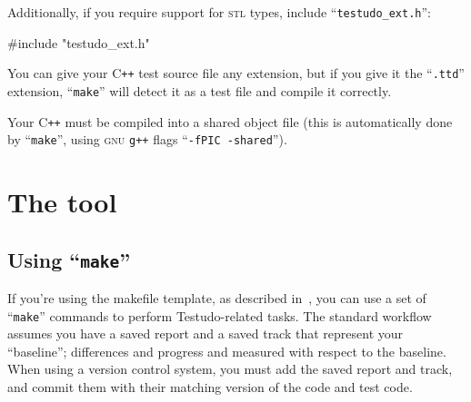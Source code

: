 \documentclass[twoside, a4paper, article]{memoir}
\newcommand*\Cpp{C\texttt{++}}
\begin{document}
Additionally, if you require support for \textsc{stl} types, include
``\texttt{testudo\_ext.h}'':
\begin{cpplisting}
#include "testudo_ext.h"
\end{cpplisting}

You can give your \Cpp{} test source file any extension, but if you give it the
``\texttt{.ttd}'' extension, ``\texttt{make}'' will detect it as a test file
and compile it correctly.

Your \Cpp{} must be compiled into a shared object file (this is automatically
done by ``\texttt{make}'', using \textsc{gnu} \texttt{g++} flags
``\texttt{-fPIC -shared}'').

\section{The tool}

\subsection{Using ``\texttt{make}''}
\label{sec:using-make}

If you're using the makefile template, as described
in~, you can use a set of ``\texttt{make}''
commands to perform Testudo-related tasks.  The standard workflow assumes you
have a saved report and a saved track that represent your ``baseline'';
differences and progress and measured with respect to the baseline.  When using
a version control system, you must add the saved report and track, and commit
them with their matching version of the code and test code.
\end{document}
